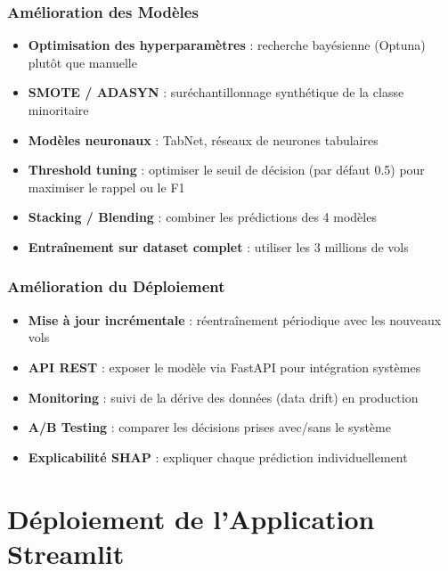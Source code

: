 \documentclass[12pt,a4paper]{article}
\begin{document}
\subsubsection{Amélioration des Modèles}

\begin{itemize}[leftmargin=*]
  \item \textbf{Optimisation des hyperparamètres} : recherche bayésienne (Optuna) 
        plutôt que manuelle
  \item \textbf{SMOTE / ADASYN} : suréchantillonnage synthétique de la classe minoritaire
  \item \textbf{Modèles neuronaux} : TabNet, réseaux de neurones tabulaires
  \item \textbf{Threshold tuning} : optimiser le seuil de décision (par défaut 0.5) 
        pour maximiser le rappel ou le F1
  \item \textbf{Stacking / Blending} : combiner les prédictions des 4 modèles
  \item \textbf{Entraînement sur dataset complet} : utiliser les 3 millions de vols
\end{itemize}

\subsubsection{Amélioration du Déploiement}

\begin{itemize}[leftmargin=*]
  \item \textbf{Mise à jour incrémentale} : réentraînement périodique avec les nouveaux vols
  \item \textbf{API REST} : exposer le modèle via FastAPI pour intégration systèmes
  \item \textbf{Monitoring} : suivi de la dérive des données (data drift) en production
  \item \textbf{A/B Testing} : comparer les décisions prises avec/sans le système
  \item \textbf{Explicabilité SHAP} : expliquer chaque prédiction individuellement
\end{itemize}

\newpage
\section{Déploiement de l'Application Streamlit}
\end{document}
